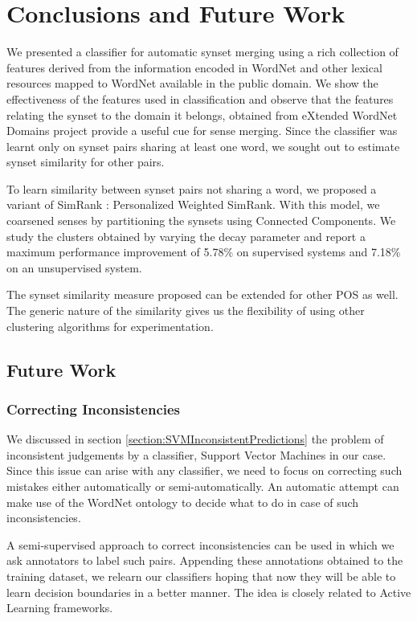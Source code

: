 \chapter{Conclusions and Future Work}
\label{chapter:conclusion}

We presented a classifier for automatic synset merging using a rich collection of features derived from the information encoded in WordNet and other lexical resources mapped to WordNet available in the public domain. We show the effectiveness of the features used in classification and observe that the features relating the synset to the domain it belongs, obtained from eXtended WordNet Domains project \citep{Gonzalez:XWND} provide a useful cue for sense merging. Since the classifier was learnt only on synset pairs sharing at least one word, we sought out to estimate synset similarity for other pairs.

To learn similarity between synset pairs not sharing a word, we proposed a variant of SimRank \citep{Jeh02simrank} : Personalized Weighted SimRank. With this model, we coarsened senses by partitioning the synsets using Connected Components. We study the clusters obtained by varying the decay parameter and report a maximum performance improvement of 5.78\% on supervised systems and 7.18\% on an unsupervised system.

The synset similarity measure proposed can be extended for other POS as well. The generic nature of the similarity gives us the flexibility of using other clustering algorithms for experimentation.

\section{Future Work}
\subsection{Correcting Inconsistencies}
We discussed in section \ref{section:SVMInconsistentPredictions} the problem of inconsistent judgements by a classifier, Support Vector Machines in our case. Since this issue can arise with any classifier, we need to focus on correcting such mistakes either automatically or semi-automatically. An automatic attempt can make use of the WordNet ontology to decide what to do in case of such inconsistencies.

A semi-supervised approach to correct inconsistencies can be used in which we ask annotators to label such pairs. Appending these annotations obtained to the training dataset, we relearn our classifiers hoping that now they will be able to learn decision boundaries in a better manner. The idea is closely related to Active Learning frameworks.

